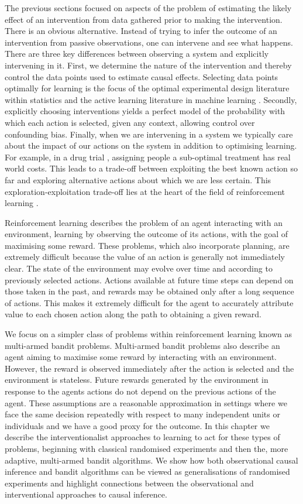 \documentclass[11pt,a4paper,twoside]{report}
\theoremstyle{plain}
\theoremstyle{definition}
\begin{document}
The previous sections focused on aspects of the problem of estimating the likely effect of an intervention from data gathered prior to making the intervention. There is an obvious alternative. Instead of trying to infer the outcome of an intervention from passive observations, one can intervene and see what happens. There are three key differences between observing a system and explicitly intervening in it. First, we determine the nature of the intervention and thereby control the data points used to estimate causal effects. Selecting data points optimally for learning is the focus of the optimal experimental design literature within statistics \citep{pukelsheim2006optimal} and the active learning literature in machine learning \citep{settles2010active}. Secondly, explicitly choosing interventions yields a perfect model of the probability with which each action is selected, given any context, allowing control over confounding bias. Finally, when we are intervening in a system we typically care about the impact of our actions on the system in addition to optimising learning. For example, in a drug trial , assigning people a sub-optimal treatment has real world costs. This leads to a trade-off between exploiting the best known action so far and exploring alternative actions about which we are less certain. This exploration-exploitation trade-off lies at the heart of the field of reinforcement learning \citep{sutton1998reinforcement}.

Reinforcement learning describes the problem of an agent interacting with an environment, learning by observing the outcome of its actions, with the goal of maximising some reward. These problems, which also incorporate planning, are extremely difficult because the value of an action is generally not immediately clear. The state of the environment may evolve over time and according to previously selected actions. Actions available at future time steps can depend on those taken in the past, and rewards may be obtained only after a long sequence of actions. This makes it extremely difficult for the agent to accurately attribute value to each chosen action along the path to obtaining a given reward. 

We focus on a simpler class of problems within reinforcement learning known as multi-armed bandit problems. Multi-armed bandit problems also describe an agent aiming to maximise some reward by interacting with an environment. However, the reward is observed immediately after the action is selected and the environment is stateless. Future rewards generated by the  environment in response to the agents actions do not depend on the previous actions of the agent. These assumptions are a reasonable approximation in settings where we face the same decision repeatedly with respect to many independent units or individuals and we have a good proxy for the outcome. In this chapter we describe the interventionalist approaches to learning to act for these types of problems, beginning with classical randomised experiments and then the, more adaptive, multi-armed bandit algorithms. We show how both observational causal inference and bandit algorithms can be viewed as generalisations of randomised experiments and highlight connections between the observational and interventional approaches to causal inference.
\end{document}
